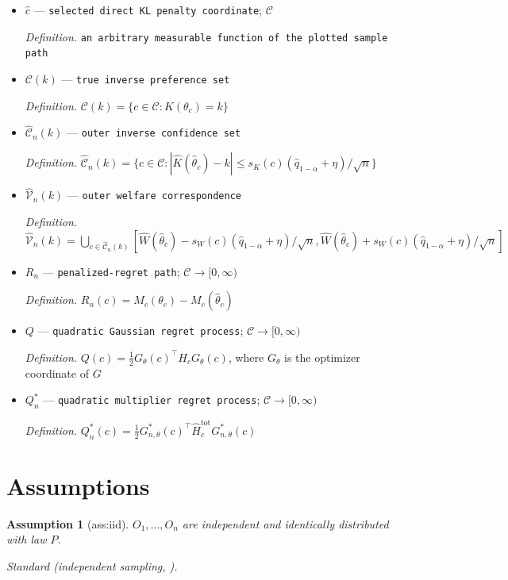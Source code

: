 \documentclass{article}
\newtheorem{assumption}{Assumption}
\begin{document}
\begin{itemize}
  \item \(\widehat c\) --- \texttt{selected direct KL penalty coordinate}; \(\mathcal C\)
  \par\smallskip\noindent\emph{Definition.} \texttt{an arbitrary measurable function of the plotted sample path}
  \item \(\mathcal C(k)\) --- \texttt{true inverse preference set}
  \par\smallskip\noindent\emph{Definition.} \(\mathcal C(k)=\{c\in\mathcal C:K(\theta_c)=k\}\)
  \item \(\widehat{\mathcal C}_n(k)\) --- \texttt{outer inverse confidence set}
  \par\smallskip\noindent\emph{Definition.} \(\widehat{\mathcal C}_n(k)=\{c\in\mathcal C:|\widehat K(\widehat\theta_c)-k|\le s_K(c)(\widehat q_{1-\alpha}+\eta)/\sqrt n\}\)
  \item \(\widehat{\mathcal V}_n(k)\) --- \texttt{outer welfare correspondence}
  \par\smallskip\noindent\emph{Definition.} \(\widehat{\mathcal V}_n(k)=\bigcup_{c\in\widehat{\mathcal C}_n(k)}[\widehat W(\widehat\theta_c)-s_W(c)(\widehat q_{1-\alpha}+\eta)/\sqrt n,\widehat W(\widehat\theta_c)+s_W(c)(\widehat q_{1-\alpha}+\eta)/\sqrt n]\)
  \item \(R_n\) --- \texttt{penalized-\allowbreak{}regret path}; \(\mathcal C\to[0,\infty)\)
  \par\smallskip\noindent\emph{Definition.} \(R_n(c)=M_c(\theta_c)-M_c(\widehat\theta_c)\)
  \item \(Q\) --- \texttt{quadratic Gaussian regret process}; \(\mathcal C\to[0,\infty)\)
  \par\smallskip\noindent\emph{Definition.} \(Q(c)=\tfrac12G_\theta(c)^\top H_cG_\theta(c)\), where \(G_\theta\) is the optimizer coordinate of \(G\)
  \item \(Q_n^*\) --- \texttt{quadratic multiplier regret process}; \(\mathcal C\to[0,\infty)\)
  \par\smallskip\noindent\emph{Definition.} \(Q_n^*(c)=\tfrac12G^*_{n,\theta}(c)^\top\widehat H_c^{\mathrm{tot}}G^*_{n,\theta}(c)\)
\end{itemize}

\section{Assumptions}

\begin{assumption}[ass:iid]\label{ass:iid}
\(O_1,\ldots,O_n\) are independent and identically distributed with law \(P\).
\par\smallskip\noindent\emph{Standard} (independent sampling, \cite{FangRidderXie2026}).
\end{assumption}
\end{document}
